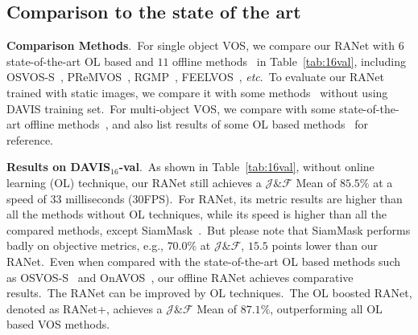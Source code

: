 \documentclass[10pt,twocolumn,letterpaper]{article}
\begin{document}
\subsection{Comparison to the state of the art}
\label{sec:compare}

\noindent
\textbf{Comparison Methods}.\ For single object VOS, we compare our RANet with $6$ state-of-the-art OL based and $11$ offline methods~\cite{osvos-s,masktrack,osvos,cinm,onavos,premvos,plm,vpn,siammask,ctn,osmn,sfl,pml,videomatch,favos,Voigtlaender2019FEELVOS,rgmp} in Table~\ref{tab:16val}, including OSVOS-S~\cite{osvos-s}, PReMVOS~\cite{premvos}, RGMP~\cite{rgmp}, FEELVOS~\cite{Voigtlaender2019FEELVOS}, \textit{etc}.\ To evaluate our RANet trained with static images, we compare it with some methods~\cite{bvs,ofl,vpn,ctn,masktrack} without using DAVIS training set.\ For multi-object VOS, we compare with some state-of-the-art offline methods~\cite{osvos,onavos,favos,osmn,videomatch}, and also list results of some OL based methods~\cite{cinm,osvos-s,onavos,osvos,videomatch} for reference.



\noindent
\textbf{Results on DAVIS$_{16}$-val}.\ As shown in Table~\ref{tab:16val}, without online learning (OL) technique, our RANet still achieves a $\mathcal{J}\&\mathcal{F}$ Mean of $85.5\%$ at a speed of $33$ milliseconds ($30$FPS).\ For RANet, its metric results are higher than all the methods without OL techniques, while its speed is higher than all the compared methods, except SiamMask~\cite{siammask}.\ But please note that SiamMask performs badly on objective metrics, e.g., $70.0\%$ at $\mathcal{J}\&\mathcal{F}$, $15.5$ points lower than our RANet.\ Even when compared with the state-of-the-art OL based methods such as OSVOS-S~\cite{osvos-s} and OnAVOS~\cite{onavos}, our offline RANet achieves comparative results.\ The RANet can be improved by OL techniques.\ The OL boosted RANet, denoted as RANet+, achieves a $\mathcal{J}\&\mathcal{F}$ Mean of $87.1\%$, outperforming all OL based VOS methods.  
\end{document}
